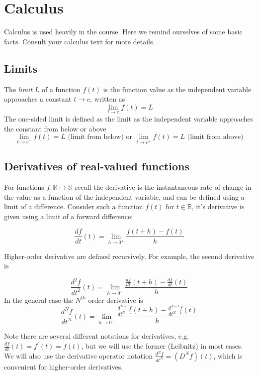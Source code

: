 \section{Calculus}

Calculus is used heavily in the course. Here we remind ourselves of some basic facts. Consult your calculus text for more details.

\subsection*{Limits}

The \textit{limit} $L$ of a function $f(t)$ is the function value as the independent variable approaches a constant $t\rightarrow c$, written as
\[
\lim_{t\rightarrow c} f(t) = L
\]
The one-sided limit is defined as the limit as the independent variable approaches the constant from below or above
\[
\lim_{t\rightarrow c^-} f(t) = L \mbox{ (limit from below) or } \lim_{t\rightarrow c^+} f(t) = L \mbox{ (limit from above)}
\]

\subsection*{Derivatives of real-valued functions}

For functions $f:\mathbb{R}\mapsto\mathbb{R}$ recall the derivative is the instantaneous rate of change in the value as a function of the independent variable, and can be defined using a limit of a difference. Consider such a function $f(t)$ for $t\in\mathbb{R}$, it's derivative is given using a limit of a forward difference:

\[
\frac{df}{dt} (t) = \lim_{h\rightarrow0^+} \frac{f(t+h)-f(t)}{h}
\]

Higher-order derivative are defined recursively. For example, the second derivative is

\[
\frac{d^2f}{dt^2} (t) = \lim_{h\rightarrow0^+} \frac{\frac{df}{dt}(t+h)-\frac{df}{dt}(t)}{h}
\]
In the general case the $N^\text{th}$ order derivative is
\[
\frac{d^Nf}{dt^N} (t) = \lim_{h\rightarrow0^+} \frac{\frac{d^{N-1}f}{dt^{N-1}}(t+h)-\frac{d^{N-1}f}{dt^{N-1}}(t)}{h}
\]

Note there are several different notations for derivatives, e.g. $\frac{df}{dt}(t) = f^\prime (t) = \dot{f}(t)$, but we will use the former (Leibnitz) in most cases. We will also use the derivative operator notation $\frac{d^Nf}{dt^N} = (D^N f)(t)$, which is convenient for higher-order derivatives.

